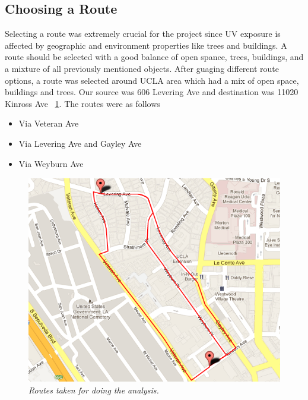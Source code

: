 \documentclass[conference]{IEEETran}
\begin{document}
\subsection{Choosing a Route}
Selecting a route was extremely crucial for the project since UV exposure is affected by geographic and environment properties like trees and buildings. A route should be selected with a good balance of open spance, trees, buildings, and a mixture of all previously mentioned objects. After guaging different route options, a route was selected around UCLA area which had a mix of open space, buildings and trees.  Our source was 606 Levering Ave and destination was 11020 Kinross Ave ~\ref{fig:Route}.  The routes were as follows
 \begin{itemize}
\item  Via Veteran Ave
\item Via Levering Ave and Gayley Ave
\item Via Weyburn Ave
 \end{itemize}
\begin{figure}  
\begin{center}  
\includegraphics[scale=0.4]{allRoutes.png}
\caption{\small \sl Routes taken for doing the analysis.\label{fig:Route}}  
\end{center}  
\end{figure} 
\end{document}
